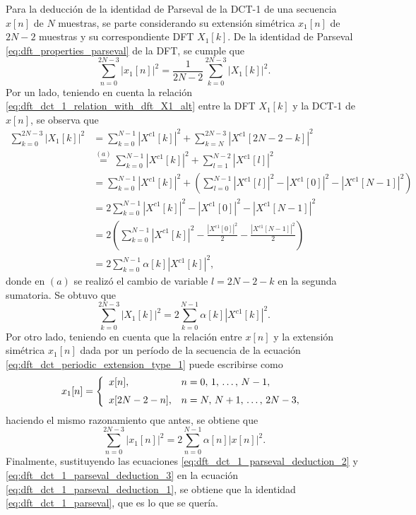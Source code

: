 \documentclass[a4paper]{report}
\begin{document}
Para la deducción de la identidad de Parseval de la DCT-1 de una secuencia \(x[n]\) de \(N\) muestras, se parte considerando su extensión simétrica \(x_1[n]\) de \(2N-2\) muestras y su correspondiente DFT \(X_1[k]\). De la identidad de Parseval \ref{eq:dft_properties_parseval} de la DFT, se cumple que
\begin{equation}\label{eq:dft_dct_1_parseval_deduction_1}
 \sum_{n=0}^{2N-3}|x_1[n]|^2=\frac{1}{2N-2}\sum_{k=0}^{2N-3}|X_1[k]|^2. 
\end{equation}
Por un lado, teniendo en cuenta la relación \ref{eq:dft_dct_1_relation_with_dft_X1_alt} entre la DFT \(X_1[k]\) y la DCT-1 de \(x[n]\), se observa que 
\begin{align*}
 \sum_{k=0}^{2N-3}|X_1[k]|^2&=\sum_{k=0}^{N-1}|X^{c1}[k]|^2+\sum_{k=N}^{2N-3}|X^{c1}[2N-2-k]|^2\\
  &\overset{(a)}{=}\sum_{k=0}^{N-1}|X^{c1}[k]|^2+\sum_{l=1}^{N-2}|X^{c1}[l]|^2\\
  &=\sum_{k=0}^{N-1}|X^{c1}[k]|^2+\left(\sum_{l=0}^{N-1}|X^{c1}[l]|^2-|X^{c1}[0]|^2-|X^{c1}[N-1]|^2\right)\\
  &=2\sum_{k=0}^{N-1}|X^{c1}[k]|^2-|X^{c1}[0]|^2-|X^{c1}[N-1]|^2\\
  &=2\left(\sum_{k=0}^{N-1}|X^{c1}[k]|^2-\frac{|X^{c1}[0]|^2}{2}-\frac{|X^{c1}[N-1]|^2}{2}\right)\\
  &=2\sum_{k=0}^{N-1}\alpha[k]|X^{c1}[k]|^2,
\end{align*}
donde en \((a)\) se realizó el cambio de variable \(l=2N-2-k\) en la segunda sumatoria. Se obtuvo que 
\begin{equation}\label{eq:dft_dct_1_parseval_deduction_2}
 \sum_{k=0}^{2N-3}|X_1[k]|^2=2\sum_{k=0}^{N-1}\alpha[k]|X^{c1}[k]|^2.
\end{equation}
Por otro lado, teniendo en cuenta que la relación entre \(x[n]\) y la extensión simétrica \(x_1[n]\) dada por un período de la secuencia de la ecuación \ref{eq:dft_dct_periodic_extension_type_1} puede escribirse como
\[
  x_1[n]=
 \left\{ 
 \begin{array}{ll}
  x[n],& n=0,\,1,\,\dots,\,N-1,\\[\medskipamount]
  x[2N-2-n],& n=N,\,N+1,\,\dots,\,2N-3,
 \end{array}
 \right.
\]
haciendo el mismo razonamiento que antes, se obtiene que 
\begin{equation}\label{eq:dft_dct_1_parseval_deduction_3}
  \sum_{n=0}^{2N-3}|x_1[n]|^2=2\sum_{n=0}^{N-1}\alpha[n]|x[n]|^2.
\end{equation}
Finalmente, sustituyendo las ecuaciones \ref{eq:dft_dct_1_parseval_deduction_2} y \ref{eq:dft_dct_1_parseval_deduction_3} en la ecuación \ref{eq:dft_dct_1_parseval_deduction_1}, se obtiene que la identidad \ref{eq:dft_dct_1_parseval}, que es lo que se quería.
\end{document}

